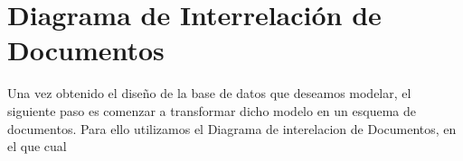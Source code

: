 \newpage
\section{Diagrama de Interrelación de Documentos}

Una vez obtenido el diseño de la base de datos que deseamos modelar, el siguiente paso es comenzar a transformar dicho modelo en un esquema de documentos. Para ello utilizamos el Diagrama de interelacion de Documentos, en el que cual 